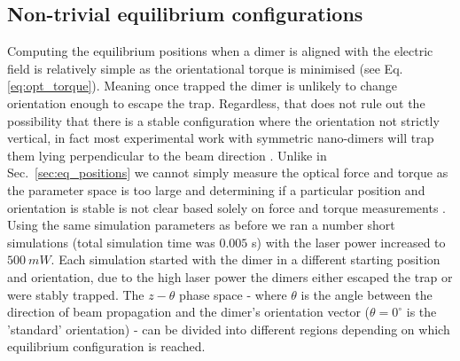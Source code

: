\newpage
\subsection{Non-trivial equilibrium configurations}
\label{sec:off-axis}
Computing the equilibrium positions when a dimer is aligned with the electric 
field is relatively simple as the orientational torque is minimised (see
Eq.\ref{eq:opt_torque}). Meaning once trapped the dimer is unlikely to change
orientation enough to escape the trap. Regardless, that does not rule out the 
possibility that there is a stable configuration where the orientation not 
strictly vertical, in fact most experimental work with symmetric nano-dimers 
will trap them lying perpendicular to the beam direction \cite{Ahn2018, 
Reimann2018}. Unlike in Sec.~\ref{sec:eq_positions} we cannot simply measure 
the optical force and torque as the parameter space is too large and determining 
if a particular position and orientation is stable is not clear based solely 
on force and torque measurements \cite{Bui2017}. Using the same simulation 
parameters as before we ran a number short simulations (total simulation time 
was $0.005$ s) with the laser power increased to $500\ mW$. Each simulation 
started with the dimer in a different starting position and orientation, due 
to the high laser power the dimers either escaped the trap or were stably 
trapped. The $z-\theta$ phase space - where $\theta$ is the angle between the 
direction of beam propagation and the dimer's orientation vector ($\theta=0^
\circ$ is the 'standard' orientation) - can be divided into different regions 
depending on which equilibrium configuration is reached.

